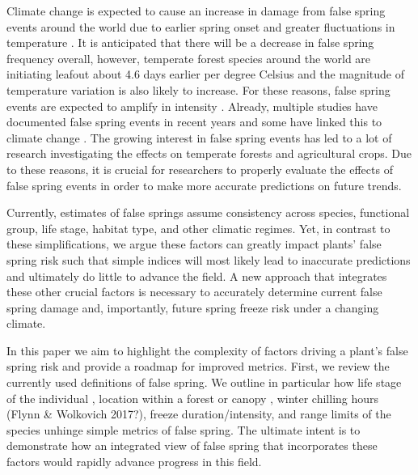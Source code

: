 \documentclass{article}\usepackage[]{graphicx}\usepackage[]{color}
\begin{document}
Climate change is expected to cause an increase in damage from false spring events around the world due to earlier spring onset and greater fluctuations in temperature \citep{Cannell1986, Inouye2008, Martin2010}. It is anticipated that there will be a decrease in false spring frequency overall, however, temperate forest species around the world are initiating leafout about 4.6 days earlier per degree Celsius \citep{Wolkovich2012, Polgar2014} and the magnitude of temperature variation is also likely to increase. For these reasons, false spring events are expected to amplify in intensity \citep{Kodra2011, Allstadt2015}. Already, multiple studies have documented false spring events in recent years \citep{Gu2008, Augspurger2009, Knudson2012, Augspurger2013} and some have linked this to climate change \citep{Ault2013, Allstadt2015, Muffler2016, Xin2016}. The growing interest in false spring events has led to a lot of research investigating the effects on temperate forests and agricultural crops. Due to these reasons, it is crucial for researchers to properly evaluate the effects of false spring events in order to make more accurate predictions on future trends. 

Currently, estimates of false springs assume consistency across species, functional group, life stage, habitat type, and other climatic regimes. Yet, in contrast to these simplifications, we argue these factors can greatly impact plants' false spring risk such that simple indices will most likely lead to inaccurate predictions and ultimately do little to advance the field. A new approach that integrates these other crucial factors is necessary to accurately determine current false spring damage and, importantly, future spring freeze risk under a changing climate. 

In this paper we aim to highlight the complexity of factors driving a plant's false spring risk and provide a roadmap for improved metrics. First, we review the currently used definitions of false spring. We outline in particular how life stage of the individual \citep{Caffarra2011}, location within a forest or canopy \citep{Augspurger2013}, winter chilling hours (Flynn \& Wolkovich 2017?), freeze duration/intensity, and range limits of the species \citep{Martin2010} unhinge simple metrics of false spring. The ultimate intent is to demonstrate how an integrated view of false spring that incorporates these factors would rapidly advance progress in this field.  
\end{document}
